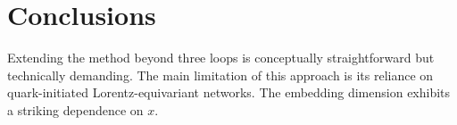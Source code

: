 \section{Conclusions}\label{sec:conclusions}

Extending the method beyond three loops is conceptually straightforward
but technically demanding. The main limitation of this approach is its
reliance on quark-initiated Lorentz-equivariant networks. The embedding
dimension exhibits a striking dependence on $x$.

